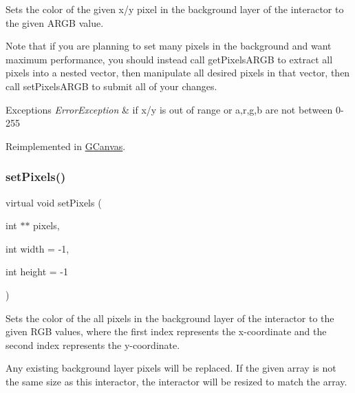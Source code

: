 Sets the color of the given x/y pixel in the background layer of the interactor to the given A\+R\+GB value. 

Note that if you are planning to set many pixels in the background and want maximum performance, you should instead call get\+Pixels\+A\+R\+GB to extract all pixels into a nested vector, then manipulate all desired pixels in that vector, then call set\+Pixels\+A\+R\+GB to submit all of your changes.


\begin{DoxyExceptions}{Exceptions}
{\em Error\+Exception} & if x/y is out of range or a,r,g,b are not between 0-\/255 \\
\hline
\end{DoxyExceptions}


Reimplemented in \mbox{\hyperlink{classsgl_1_1GCanvas_a2d22778c4fdce45bb2df60518000c5ad}{G\+Canvas}}.

\mbox{\label{classsgl_1_1GDrawingSurface_a7771c343e50fbc67cb309755840e512d}} 
\subsubsection{\texorpdfstring{set\+Pixels()}{setPixels()}\hspace{0.1cm}{\footnotesize\ttfamily [1/2]}}
{\footnotesize\ttfamily virtual void set\+Pixels (\begin{DoxyParamCaption}\item[{int $\ast$$\ast$}]{pixels,  }\item[{int}]{width = {\ttfamily -\/1},  }\item[{int}]{height = {\ttfamily -\/1} }\end{DoxyParamCaption})\hspace{0.3cm}{\ttfamily [pure virtual]}}



Sets the color of the all pixels in the background layer of the interactor to the given R\+GB values, where the first index represents the x-\/coordinate and the second index represents the y-\/coordinate. 

Any existing background layer pixels will be replaced. If the given array is not the same size as this interactor, the interactor will be resized to match the array. 

